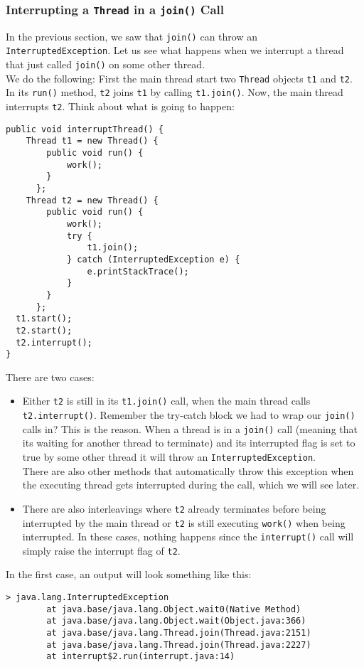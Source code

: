\documentclass[main.tex]{subfiles}
\begin{document}
\subsubsection{Interrupting a \texttt{Thread} in a \texttt{join()} Call}
In the previous section, we saw that \texttt{join()} can throw an \texttt{InterruptedException}. Let us see what happens when we interrupt a thread that just called \texttt{join()} on some other thread.\\[3mm]
We do the following: First the main thread start two \texttt{Thread} objects \texttt{t1} and \texttt{t2}. In its \texttt{run()} method, \texttt{t2} joins \texttt{t1} by calling \texttt{t1.join()}. Now, the main thread interrupts \texttt{t2}. Think about what is going to happen:
\begin{verbatim}
public void interruptThread() {
    Thread t1 = new Thread() {
        public void run() {
            work();
        }
      };
    Thread t2 = new Thread() {
        public void run() {
            work();
            try {
                t1.join();
            } catch (InterruptedException e) {
                e.printStackTrace();
            }
        }
      };
  t1.start();
  t2.start();
  t2.interrupt();
}
\end{verbatim}
There are two cases:
\begin{itemize}
    \item Either \texttt{t2} is still in its \texttt{t1.join()} call, when the main thread calls \texttt{t2.interrupt()}. Remember the try-catch block we had to wrap our \texttt{join()} calls in? This is the reason. When a thread is in a \texttt{join()} call (meaning that its waiting for another thread to terminate) and its interrupted flag is set to true by some other thread it will throw an \texttt{InterruptedException}.\\
          There are also other methods that automatically throw this exception when the executing thread gets interrupted during the call, which we will see later.
    \item There are also interleavings where \texttt{t2} already terminates before being interrupted by the main thread or \texttt{t2} is still executing \texttt{work()} when being interrupted. In these cases, nothing happens since the \texttt{interrupt()} call will simply raise the interrupt flag of \texttt{t2}.
\end{itemize}
In the first case, an output will look something like this:
\begin{verbatim}
> java.lang.InterruptedException
        at java.base/java.lang.Object.wait0(Native Method)
        at java.base/java.lang.Object.wait(Object.java:366)
        at java.base/java.lang.Thread.join(Thread.java:2151)
        at java.base/java.lang.Thread.join(Thread.java:2227)
        at interrupt$2.run(interrupt.java:14)
\end{verbatim}
\end{document}
